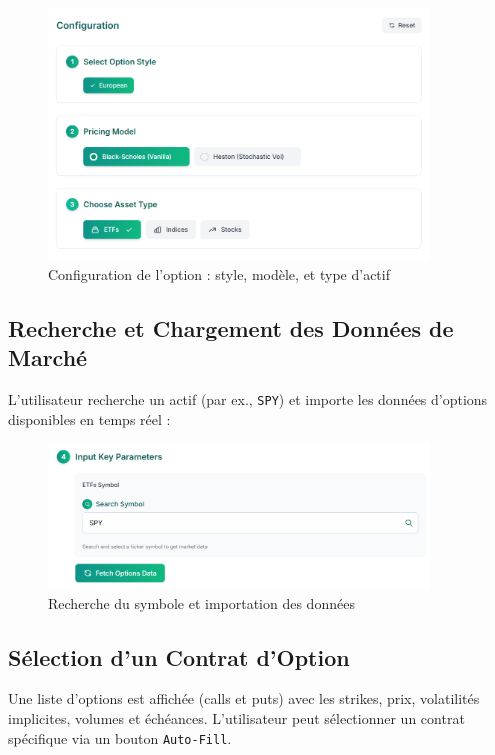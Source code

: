 \begin{figure}[H] \centering \includegraphics[width=0.9\textwidth]{images/1.png} \caption{Configuration de l'option : style, modèle, et type d'actif} \end{figure}

\subsection{Recherche et Chargement des Données de Marché}

L'utilisateur recherche un actif (par ex., \texttt{SPY}) et importe les données d'options disponibles en temps réel :

\begin{figure}[H] \centering \includegraphics[width=0.9\textwidth]{images/2.png} \caption{Recherche du symbole et importation des données} \end{figure}

\subsection{Sélection d'un Contrat d'Option}

Une liste d'options est affichée (calls et puts) avec les strikes, prix, volatilités implicites, volumes et échéances. L'utilisateur peut sélectionner un contrat spécifique via un bouton \texttt{Auto-Fill}.

